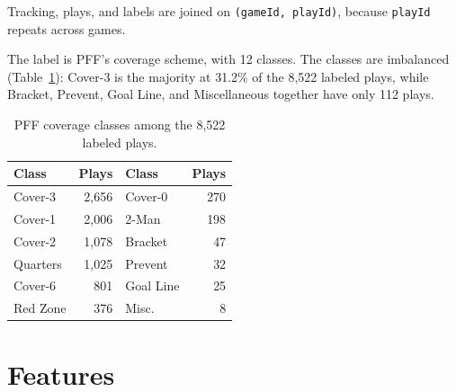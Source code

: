 \documentclass[11pt]{article}
\begin{document}
Tracking, plays, and labels are joined on \texttt{(gameId, playId)}, because \texttt{playId} repeats across games.

The label is PFF's coverage scheme, with 12 classes. The classes are imbalanced (Table~\ref{tab:classes}): Cover-3 is the majority at 31.2\% of the 8,522 labeled plays, while Bracket, Prevent, Goal Line, and Miscellaneous together have only 112 plays.

\begin{table}[t]
  \centering
  \small
  \begin{tabular}{lrlr}
    \hline
    \textbf{Class} & \textbf{Plays} & \textbf{Class} & \textbf{Plays} \\
    \hline
    Cover-3  & 2,656 & Cover-0   & 270 \\
    Cover-1  & 2,006 & 2-Man     & 198 \\
    Cover-2  & 1,078 & Bracket   & 47 \\
    Quarters & 1,025 & Prevent   & 32 \\
    Cover-6  & 801   & Goal Line & 25 \\
    Red Zone & 376   & Misc.     & 8 \\
    \hline
  \end{tabular}
  \caption{\label{tab:classes}PFF coverage classes among the 8,522 labeled plays.}
\end{table}

\section{Features}
\end{document}
